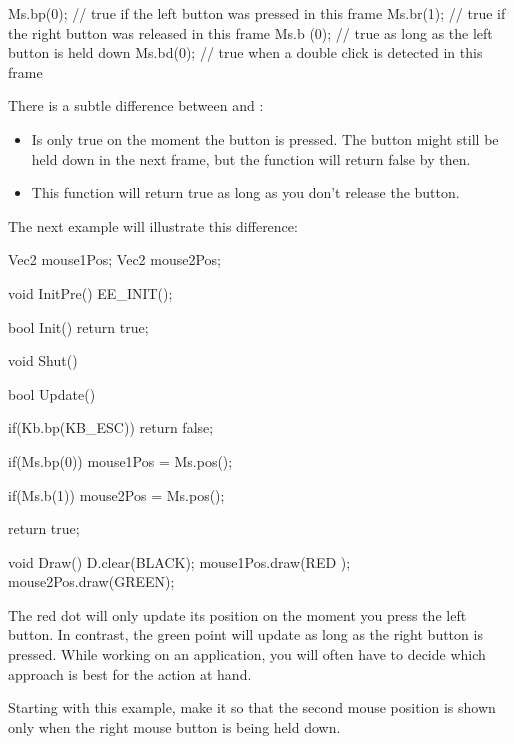 \begin{code}
Ms.bp(0); // true if the left button was pressed in this frame
Ms.br(1); // true if the right button was released in this frame
Ms.b (0); // true as long as the left button is held down
Ms.bd(0); // true when a double click is detected in this frame
\end{code}

There is a subtle difference between  and :
\begin{itemize}
	\item {} Is only true on the moment the button is pressed. The button might still be held down in the next frame, but the function will return false by then.
	\item {} This function will return true as long as you don't release the button.
\end{itemize}

The next example will illustrate this difference:

\begin{code}
Vec2 mouse1Pos;
Vec2 mouse2Pos;

void InitPre()
{
   EE_INIT();
}

bool Init()
{   
   return true;
}

void Shut() {}

bool Update()
{
   if(Kb.bp(KB_ESC)) return false;
   
   if(Ms.bp(0)) {
      mouse1Pos = Ms.pos();
   }
   
   if(Ms.b(1)) {
      mouse2Pos = Ms.pos();
   }
   
   return true;
}

void Draw()
{
   D.clear(BLACK);
   mouse1Pos.draw(RED  );
   mouse2Pos.draw(GREEN);
}
\end{code}

The red dot will only update its position on the moment you press the left button. In contrast, the green point will update as long as the right button is pressed. While working on an application, you will often have to decide which approach is best for the action at hand.

\begin{exercise}
Starting with this example, make it so that the second mouse position is shown only when the right mouse button is being held down.
\end{exercise} 


